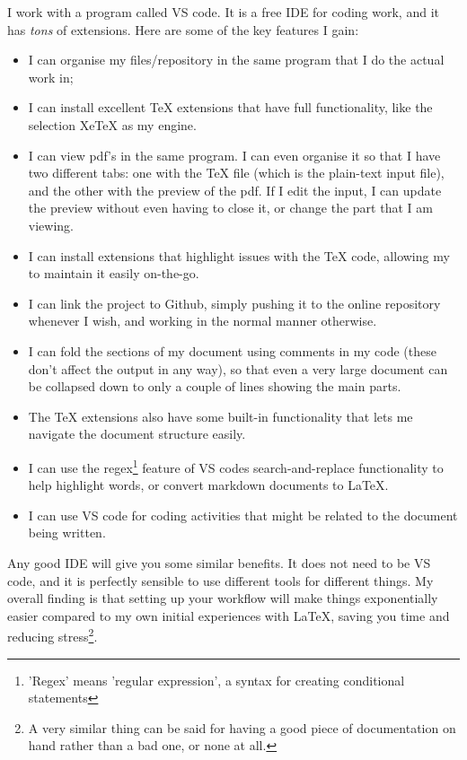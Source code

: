 \documentclass[12pt, oneside]{memoir}
\begin{document}
I work with a program called VS code. It is a free IDE for coding work, and it has \emph{tons} of extensions. Here are some of the key features I gain:
\begin{itemize}
    \item I can organise my files/repository in the same program that I do the actual work in;
    \item I can install excellent TeX extensions that have full functionality, like the selection XeTeX as my engine.
    \item I can view pdf's in the same program. I can even organise it so that I have two different tabs: one with the TeX file (which is the plain-text input file), and the other with the preview of the pdf. If I edit the input, I can update the preview without even having to close it, or change the part that I am viewing.
    \item I can install extensions that highlight issues with the TeX code, allowing my to maintain it easily on-the-go.
    \item I can link the project to Github, simply pushing it to the online repository whenever I wish, and working in the normal manner otherwise.
    \item I can fold the sections of my document using comments in my code (these don't affect the output in any way), so that even a very large document can be collapsed down to only a couple of lines showing the main parts.
    \item The TeX extensions also have some built-in functionality that lets me navigate the document structure easily.
    \item I can use the regex\footnote{'Regex' means 'regular expression', a syntax for creating conditional statements} feature of VS codes search-and-replace functionality to help highlight words, or convert markdown documents to LaTeX.
    \item I can use VS code for coding activities that might be related to the document being written.
\end{itemize}

Any good IDE will give you some similar benefits. It does not need to be VS code, and it is perfectly sensible to use different tools for different things. My overall finding is that setting up your workflow will make things exponentially easier compared to my own initial experiences with LaTeX, saving you time and reducing stress\footnote{ A very similar thing can be said for having a good piece of documentation on hand rather than a bad one, or none at all.}.
\end{document}

